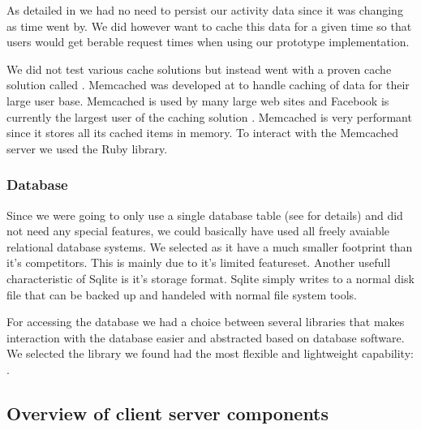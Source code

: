 As detailed in  we had no need
to persist our activity data since it was changing as time went by. We did
however want to cache this data for a given time so that users would get
berable request times when using our prototype implementation.

We did not test various cache solutions but instead went with a proven
cache solution called %
.
Memcached was developed at %
to handle caching of data for their large user base. Memcached is used by many
large web sites and Facebook is currently the largest user of the
caching solution \citep{facebook08b}. Memcached is very performant since it
stores all its cached items in memory. To interact with the Memcached server
we used the %
Ruby library.

\subsubsection{Database}

Since we were going to only use a single database table
(see  for details)
and did not need any special features, we could
basically have used all freely avaiable relational database systems. We
selected %
as it have a much smaller footprint than it's
competitors. This is mainly due to it's limited featureset. Another usefull
characteristic of Sqlite is it's storage format. Sqlite simply writes to a
normal disk file that can be backed up and handeled with normal
file system tools.

For accessing the database we had a choice between several libraries that
makes interaction with the database easier and abstracted based on database
software.
We selected the library we found had the most flexible and lightweight
 capability: %
.

\subsection{Overview of client \oldand server components}

